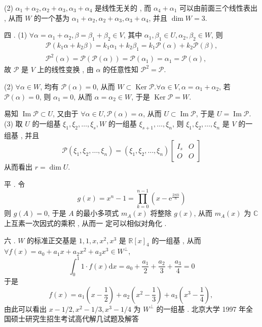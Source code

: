 \documentclass[10pt]{article}
\begin{document}
(2) $\alpha_{1}+\alpha_{2}, \alpha_{2}+\alpha_{3}, \alpha_{3}+\alpha_{4}$  是线性无关的 ,  而  $\alpha_{4}+\alpha_{1}$  可以由前面三个线性表出 ,  从而  $W$  的一个基为  $\alpha_{1}+\alpha_{2}, \alpha_{2}+\alpha_{3}, \alpha_{3}+\alpha_{4}$,  并且  $\operatorname{dim} W=3 .$

 四 . (1) $\forall \alpha=\alpha_{1}+\alpha_{2}, \beta=\beta_{1}+\beta_{2} \in V$,  其中  $\alpha_{1}, \beta_{1} \in U, \alpha_{2}, \beta_{2} \in W$,  则 
$$
\begin{gathered}
\mathscr{P}\left(k_{1} \alpha+k_{2} \beta\right)=k_{1} \alpha_{1}+k_{2} \beta_{1}=k_{1} \mathscr{P}(\alpha)+k_{2} \mathscr{P}(\beta), \\
\mathscr{P}^{2}(\alpha)=\mathscr{P}(\mathscr{P}(\alpha))=\mathscr{P}\left(\alpha_{1}\right)=\alpha_{1}=\mathscr{P}(\alpha),
\end{gathered}
$$
 故  $\mathscr{P}$  是  $V$  上的线性变换 ,  由  $\alpha$  的任意性知  $\mathscr{P}^{2}=\mathscr{P}$.

(2) $\forall \alpha \in W$,  均有  $\mathscr{P}(\alpha)=0$,  从而  $W \subset \operatorname{Ker} \mathscr{P} . \forall \alpha \in V, \alpha=\alpha_{1}+\alpha_{2}$,  若  $\mathscr{P}(\alpha)=0$,  则  $\alpha_{1}=0$,  从而  $\alpha=\alpha_{2} \in W$,  于是  $\operatorname{Ker} \mathscr{P}=W$.

 易知  $\operatorname{Im} \mathscr{P} \subset U$,  又由于  $\forall \alpha \in U, \mathscr{P}(\alpha)=\alpha$,  从而  $U \subset \operatorname{Im} \mathscr{P}$,  于是  $U=\operatorname{Im} \mathscr{P}$. (3)  取  $U$  的一组基  $\xi_{1}, \xi_{2}, \ldots, \xi_{s}, W$  的一组基  $\xi_{s+1}, \ldots, \xi_{n}$,  则  $\xi_{1}, \xi_{2}, \ldots, \xi_{n}$  是  $V$  的一组基 ,  并且 
$$
\mathscr{P}\left(\xi_{1}, \xi_{2}, \ldots, \xi_{n}\right)=\left(\xi_{1}, \xi_{2}, \ldots, \xi_{n}\right)\left[\begin{array}{cc}
I_{s} & O \\
O & O
\end{array}\right]
$$
 从而看出  $r=\operatorname{dim} U$.

 平 .  令 
$$
g(x)=x^{n}-1=\prod_{k=0}^{n-1}\left(x-\mathrm{e}^{\frac{2 \pi k \mathrm{i}}{n}}\right)
$$
 则  $g(A)=0$,  于是  $A$  的最小多项式  $m_{A}(x)$  将整除  $g(x)$,  从而  $m_{A}(x)$  为  $\mathbb{C}$  上互素一次因式的乘积 ,  从而一   定可以相似对角化 .

 六 . $W$  的标准正交基是  $1,1, x, x^{2}, x^{3}$  是  $\mathbb{R}[x]_{4}$  的一组基 ,  从而  $\forall f(x)=a_{0}+a_{1} x+a_{2} x^{2}+a_{3} x^{3} \in W^{\perp}$,
$$
\int_{0}^{1} 1 \cdot f(x) \mathrm{d} x=a_{0}+\frac{a_{1}}{2}+\frac{a_{2}}{3}+\frac{a_{3}}{4}=0
$$
 于是 
$$
f(x)=a_{1}\left(x-\frac{1}{2}\right)+a_{2}\left(x^{2}-\frac{1}{3}\right)+a_{3}\left(x^{3}-\frac{1}{4}\right) \text {, }
$$
 由此可以看出  $x-1 / 2, x^{2}-1 / 3, x^{3}-1 / 4$  为  $W^{\perp}$  的一组基 .  北京大学  1997  年全国硕士研究生招生考试高代解几试题及解答 
\end{document}

